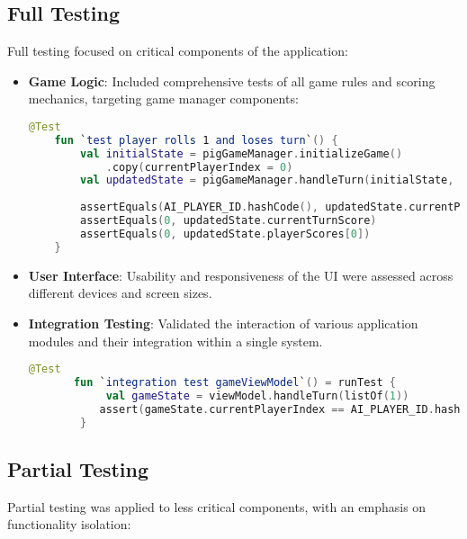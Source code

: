 \subsection{Full Testing}

Full testing focused on critical components of the application:
\begin{itemize}
    \item \textbf{Game Logic}: Included comprehensive tests of all game rules and scoring mechanics, targeting game manager components:
    \begin{lstlisting}[language=Kotlin, caption=Unit Test for Game Logic, label=lst:game_logic_unit]
    @Test
    fun `test player rolls 1 and loses turn`() {
        val initialState = pigGameManager.initializeGame()
            .copy(currentPlayerIndex = 0)
        val updatedState = pigGameManager.handleTurn(initialState, 1)
            
        assertEquals(AI_PLAYER_ID.hashCode(), updatedState.currentPlayerIndex)
        assertEquals(0, updatedState.currentTurnScore)
        assertEquals(0, updatedState.playerScores[0])
    } 
    \end{lstlisting}

    \item \textbf{User Interface}: Usability and responsiveness of the UI were assessed across different devices and screen sizes.
    \item \textbf{Integration Testing}: Validated the interaction of various application modules and their integration within a single system.
    \begin{lstlisting}[language=Kotlin, caption=Integration Test for Game View Model, label=lst:integration_game_view_model]
       @Test
       fun `integration test gameViewModel`() = runTest {
            val gameState = viewModel.handleTurn(listOf(1))
           assert(gameState.currentPlayerIndex == AI_PLAYER_ID.hashCode())
        } 
    \end{lstlisting}
\end{itemize}

\subsection{Partial Testing}

Partial testing was applied to less critical components, with an emphasis on functionality isolation:

